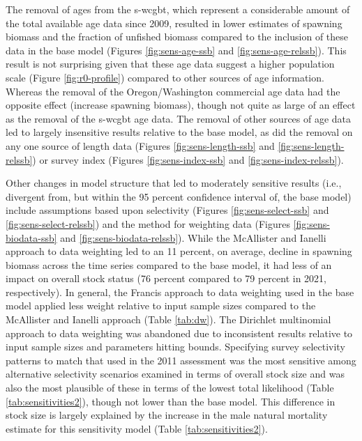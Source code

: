 \documentclass[11pt,
  english,
  a4paper,
]{article}
\begin{document}
\leavevmode\tagmcend\tagstructend\par


The removal of ages from the \gls{s-wcgbt}, which represent a considerable amount of the total available age data since 2009, resulted in lower estimates of spawning biomass and the fraction of unfished biomass compared to the inclusion of these data in the base model (Figures \ref{fig:sens-age-ssb} and \ref{fig:sens-age-relssb}). This result is not surprising given that these age data suggest a higher population scale (Figure \ref{fig:r0-profile}) compared to other sources of age information. Whereas the removal of the Oregon/Washington commercial age data had the opposite effect (increase spawning biomass), though not quite as large of an effect as the removal of the \gls{s-wcgbt} age data. The removal of other sources of age data led to largely insensitive results relative to the base model, as did the removal on any one source of length data (Figures \ref{fig:sens-length-ssb} and \ref{fig:sens-length-relssb}) or survey index (Figures \ref{fig:sens-index-ssb} and \ref{fig:sens-index-relssb}).

\leavevmode\tagmcend\tagstructend\par


Other changes in model structure that led to moderately sensitive results (i.e., divergent from, but within the 95 percent confidence interval of, the base model) include assumptions based upon selectivity (Figures \ref{fig:sens-select-ssb} and \ref{fig:sens-select-relssb}) and the method for weighting data (Figures \ref{fig:sens-biodata-ssb} and \ref{fig:sens-biodata-relssb}). While the McAllister and Ianelli approach to data weighting led to an 11 percent, on average, decline in spawning biomass across the time series compared to the base model, it had less of an impact on overall stock status (76 percent compared to 79 percent in 2021, respectively). In general, the Francis approach to data weighting used in the base model applied less weight relative to input sample sizes compared to the McAllister and Ianelli approach (Table \ref{tab:dw}). The Dirichlet multinomial approach to data weighting was abandoned due to inconsistent results relative to input sample sizes and parameters hitting bounds. Specifying survey selectivity patterns to match that used in the 2011 assessment was the most sensitive among alternative selectivity scenarios examined in terms of overall stock size and was also the most plausible of these in terms of the lowest total likelihood (Table \ref{tab:sensitivities2}), though not lower than the base model. This difference in stock size is largely explained by the increase in the male natural mortality estimate for this sensitivity model (Table \ref{tab:sensitivities2}).
\end{document}
